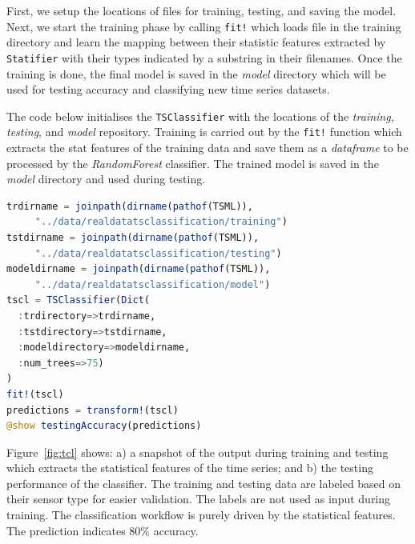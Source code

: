 \documentclass{juliacon}
\begin{document}
\vskip 6pt

First, we setup the locations of files for training, testing, and saving the model.
Next, we start the training phase by calling \texttt{fit!} which loads
file in the training directory and learn the mapping between their
statistic features extracted by \texttt{Statifier} with their types indicated
by a substring in their filenames. Once the training is done, the final model
is saved in the \emph{model} directory which will be used for 
testing accuracy and classifying new time series datasets. 

\vskip 6pt

The code below initialises the \texttt{TSClassifier} with the locations of the \emph{training}, \emph{testing}, and \emph{model} repository. Training is carried out by the \texttt{fit!} function which extracts the stat features of the training data and save them as a \emph{dataframe}  to be processed by the \emph{RandomForest} classifier. The trained model is saved in the \emph{model} directory and used during testing.

\begin{lstlisting}[language = Julia]
trdirname = joinpath(dirname(pathof(TSML)),
     "../data/realdatatsclassification/training")
tstdirname = joinpath(dirname(pathof(TSML)),
     "../data/realdatatsclassification/testing")
modeldirname = joinpath(dirname(pathof(TSML)),
     "../data/realdatatsclassification/model")
tscl = TSClassifier(Dict(
  :trdirectory=>trdirname,
  :tstdirectory=>tstdirname,
  :modeldirectory=>modeldirname,
  :num_trees=>75)
)
fit!(tscl)
predictions = transform!(tscl)
@show testingAccuracy(predictions)
\end{lstlisting}

Figure~\ref{fig:tcl} shows: a) a snapshot of the output during training and testing which extracts the statistical features of the time series; and b) the testing performance of the classifier. The training and testing data are labeled based on their sensor type for easier validation. The labels are not used as input during training. The classification workflow is purely driven by the statistical features. The prediction indicates 80\% accuracy.
\end{document}

